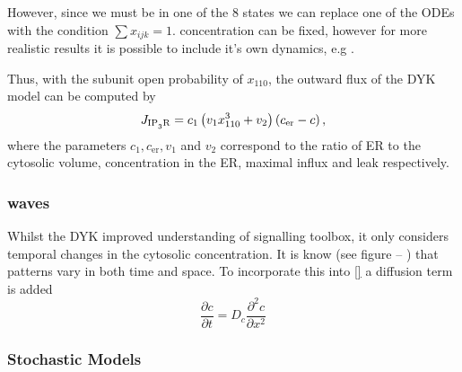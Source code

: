 \documentclass[../main.tex]{subfiles}
\begin{document}
However, since we must be in one of the 8 states we can replace one of the ODEs with the condition $\sum x_{ijk} = 1$.  concentration can be fixed, however for more realistic results it is possible to include it's own dynamics, e.g \cite{DeYoung_1992, Cuthbertson_1991, Chay_1995,Kummer_2005}.

Thus, with the  subunit open probability of $x_{110}$, the outward flux of the DYK model can be computed by
\begin{equation}
J_{\mathrm{\ce{IP_3R}}} = c_1 \left( v_1 x_{110}^3 +v_2 \right) \left(c_{\mathrm{er}} - c \right),
\end{equation}
where the parameters $c_1, c_{\mathrm{er}}, v_1$ and $v_2$ correspond to the ratio of ER to the cytosolic volume,  concentration in the ER, maximal  influx and  leak respectively. 
    
    
    
\subsubsection{ waves}
Whilst the DYK improved understanding of  signalling toolbox, it only considers temporal changes in the cytosolic  concentration. It is know (see figure -- ) that  patterns vary in both time and space. To incorporate this into \eqref{} a diffusion term is added
\begin{equation}
\frac{\partial c}{\partial t} = D_c\frac{\partial^2 c}{\partial x^2}
\end{equation}

\subsubsection{Stochastic Models}
   
\end{document}
